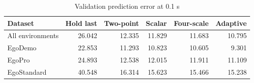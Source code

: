 \begin{table}[htbp]
\centering
\small
\caption{Validation prediction error at 0.1 s}
\label{tab:point}
\setlength{\tabcolsep}{4pt}
\begin{tabular}{lrrrrr}
\toprule
Dataset & Hold last & Two-point & Scalar & Four-scale & Adaptive\\
\midrule
All environments & 26.042 & 12.335 & 11.829 & 11.683 & 10.795\\
EgoDemo & 22.853 & 11.293 & 10.823 & 10.605 & 9.301\\
EgoPro & 24.893 & 12.538 & 12.015 & 11.911 & 11.109\\
EgoStandard & 40.548 & 16.314 & 15.623 & 15.466 & 15.238\\
\bottomrule
\end{tabular}
\end{table}
